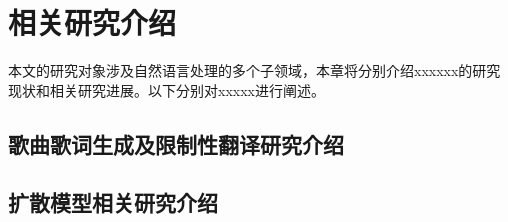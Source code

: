 \chapter{相关研究介绍}
本文的研究对象涉及自然语言处理的多个子领域，本章将分别介绍xxxxxx的研究现状和相关研究进展。以下分别对xxxxx进行阐述。
\section{歌曲歌词生成及限制性翻译研究介绍}
\section{扩散模型相关研究介绍}
